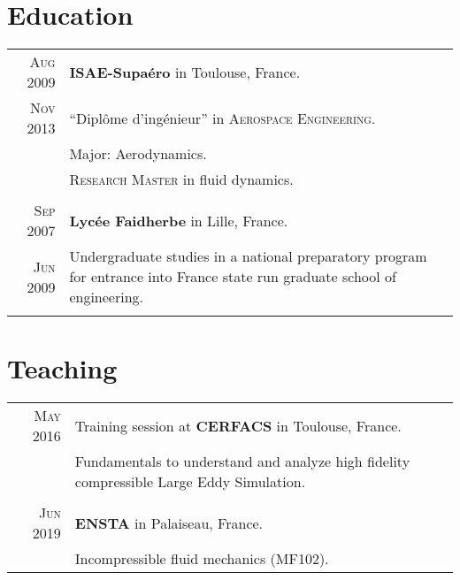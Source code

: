 \documentclass[a4paper,10pt]{article}
\begin{document}
\section{Education}
\begin{tabular}{r|p{15cm}}
    \textsc{Aug} 2009 & \textbf{ISAE-Supa\'ero} in Toulouse, France.                                                                               \\
    \textsc{Nov} 2013 & ``Dipl\^{o}me d'ing\'{e}nieur'' in \textsc{Aerospace Engineering}.                                                         \\
                      & Major: Aerodynamics.                                                                                                       \\
                      & \textsc{Research Master} in fluid dynamics.                                                                                \\
    \multicolumn{2}{c}{}                                                                                                                           \\

    \textsc{Sep} 2007 & \textbf{Lycée Faidherbe} in Lille, France.                                                                                 \\
    \textsc{Jun} 2009 & Undergraduate studies in a national preparatory program for entrance into France state run graduate school of engineering. \\
    \multicolumn{2}{c}{}                                                                                                                           \\
\end{tabular}

\section{Teaching}
\begin{tabular}{r|p{15cm}}
    \textsc{May} 2016 & Training session at \textbf{CERFACS} in Toulouse, France.                                \\
                      & Fundamentals to understand and analyze high fidelity compressible Large Eddy Simulation. \\
    \multicolumn{2}{c}{}                                                                                         \\

    \textsc{Jun} 2019 & \textbf{ENSTA} in Palaiseau, France.                                                     \\
                      & Incompressible fluid mechanics (MF102).                                                  \\
\end{tabular}
\end{document}
